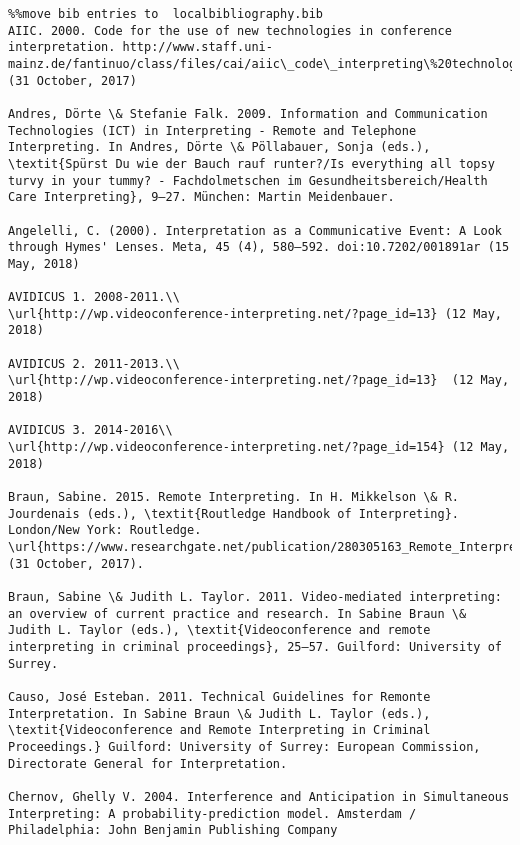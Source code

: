 \documentclass[output=paper]{langsci/langscibook}
\begin{document}
\begin{verbatim}%%move bib entries to  localbibliography.bib
AIIC. 2000. Code for the use of new technologies in conference interpretation. http://www.staff.uni-mainz.de/fantinuo/class/files/cai/aiic\_code\_interpreting\%20technologies.pdf (31 October, 2017)

Andres, Dörte \& Stefanie Falk. 2009. Information and Communication Technologies (ICT) in Interpreting - Remote and Telephone Interpreting. In Andres, Dörte \& Pöllabauer, Sonja (eds.), \textit{Spürst Du wie der Bauch rauf runter?/Is everything all topsy turvy in your tummy? - Fachdolmetschen im Gesundheitsbereich/Health Care Interpreting}, 9–27. München: Martin Meidenbauer.

Angelelli, C. (2000). Interpretation as a Communicative Event: A Look through Hymes' Lenses. Meta, 45 (4), 580–592. doi:10.7202/001891ar (15 May, 2018)

AVIDICUS 1. 2008-2011.\\
\url{http://wp.videoconference-interpreting.net/?page_id=13} (12 May, 2018)

AVIDICUS 2. 2011-2013.\\
\url{http://wp.videoconference-interpreting.net/?page_id=13}  (12 May, 2018)

AVIDICUS 3. 2014-2016\\
\url{http://wp.videoconference-interpreting.net/?page_id=154} (12 May, 2018)

Braun, Sabine. 2015. Remote Interpreting. In H. Mikkelson \& R. Jourdenais (eds.), \textit{Routledge Handbook of Interpreting}. London/New York: Routledge. \url{https://www.researchgate.net/publication/280305163_Remote_Interpreting} (31 October, 2017).

Braun, Sabine \& Judith L. Taylor. 2011. Video-mediated interpreting: an overview of current practice and research. In Sabine Braun \& Judith L. Taylor (eds.), \textit{Videoconference and remote interpreting in criminal proceedings}, 25–57. Guilford: University of Surrey.

Causo, José Esteban. 2011. Technical Guidelines for Remonte Interpretation. In Sabine Braun \& Judith L. Taylor (eds.), \textit{Videoconference and Remote Interpreting in Criminal Proceedings.} Guilford: University of Surrey: European Commission, Directorate General for Interpretation.

Chernov, Ghelly V. 2004. Interference and Anticipation in Simultaneous Interpreting: A probability-prediction model. Amsterdam / Philadelphia: John Benjamin Publishing Company


\end{verbatim}
\end{document}
